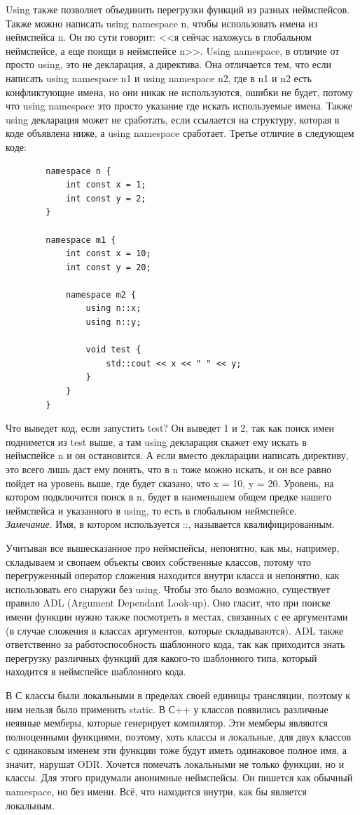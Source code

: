 \documentclass[12pt, a4paper]{article}
\begin{document}
	Using также позволяет объединить перегрузки функций из разных неймспейсов. Также можно написать using namespace n, чтобы использовать имена из неймспейса n. Он по сути говорит: <<я сейчас нахожусь в глобальном неймспейсе, а еще поищи в неймспейсе n>>. Using namespace, в отличие от просто using, это не декларация, а директива. Она отличается тем, что если написать using namespace n1 и using namespace n2, где в n1 и n2 есть конфликтующие имена, но они никак не используются, ошибки не будет, потому что using namespace это просто указание где искать используемые имена. Также using декларация может не сработать, если ссылается на структуру, которая в коде объявлена ниже, а using namespace сработает. Третье отличие в следующем коде:
	\begin{verbatim}
		namespace n {
			int const x = 1;
			int const y = 2;
		}
		
		namespace m1 {
			int const x = 10;
			int const y = 20;
			
			namespace m2 {
				using n::x;
				using n::y;
				
				void test {
					std::cout << x << " " << y;
				}
			}
		}
	\end{verbatim}
	Что выведет код, если запустить test? Он выведет 1 и 2, так как поиск имен поднимется из test выше, а там using декларация скажет ему искать в неймспейсе n и он остановится. А если вместо декларации написать директиву, это всего лишь даст ему понять, что в n тоже можно искать, и он все равно пойдет на уровень выше, где будет сказано, что x = 10, y = 20. Уровень, на котором подключится поиск в n, будет в наименьшем общем предке нашего неймспейса и указанного в using, то есть в глобальном неймспейсе.\\
	\textit{Замечание}. Имя, в котором используется ::, называется квалифицированным.
	\\\par Учитывая все вышесказанное про неймспейсы, непонятно, как мы, например, складываем и свопаем объекты своих собственные классов, потому что перегруженный оператор сложения находится внутри класса и непонятно, как использовать его снаружи без using. Чтобы это было возможно, существует правило ADL (Argument Dependant Look-up). Оно гласит, что при поиске имени функции нужно также посмотреть в местах, связанных с ее аргументами (в случае сложения в классах аргументов, которые складываются). ADL также ответственно за работоспособность шаблонного кода, так как приходится знать перегрузку различных функций для какого-то шаблонного типа, который находится в неймспейсе шаблонного кода.
	\\\par В С классы были локальными в пределах своей единицы трансляции, поэтому к ним нельзя было применить static. В С++ у классов появились различные неявные мемберы, которые генерирует компилятор. Эти мемберы являются полноценными функциями, поэтому, хоть классы и локальные, для двух классов с одинаковым именем эти функции тоже будут иметь одинаковое полное имя, а значит, нарушат ODR. Хочется помечать локальными не только функции, но и классы. Для этого придумали анонимные неймспейсы. Он пишется как обычный namespace, но без имени. Всё, что находится внутри, как бы является локальным.
\end{document}
